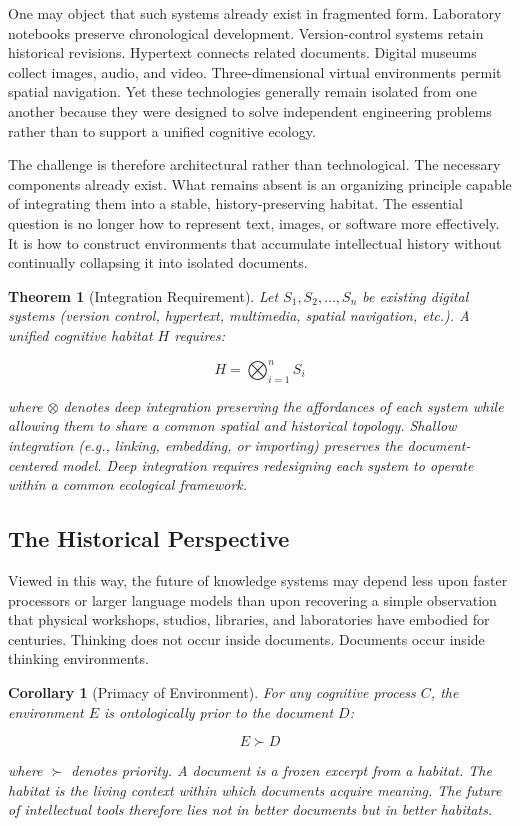 \documentclass[12pt,oneside]{article}
\newtheorem{theorem}[definition]{Theorem}
\newtheorem{corollary}[definition]{Corollary}
\theoremstyle{remark}
\begin{document}
One may object that such systems already exist in fragmented form. Laboratory notebooks preserve chronological development. Version-control systems retain historical revisions. Hypertext connects related documents. Digital museums collect images, audio, and video. Three-dimensional virtual environments permit spatial navigation. Yet these technologies generally remain isolated from one another because they were designed to solve independent engineering problems rather than to support a unified cognitive ecology.

The challenge is therefore architectural rather than technological. The necessary components already exist. What remains absent is an organizing principle capable of integrating them into a stable, history-preserving habitat. The essential question is no longer how to represent text, images, or software more effectively. It is how to construct environments that accumulate intellectual history without continually collapsing it into isolated documents.

\begin{theorem}[Integration Requirement]
Let $S_1, S_2, \ldots, S_n$ be existing digital systems (version control, hypertext, multimedia, spatial navigation, etc.). A unified cognitive habitat $H$ requires:

\begin{equation}
H = \bigotimes_{i=1}^{n} S_i
\end{equation}

where $\otimes$ denotes deep integration preserving the affordances of each system while allowing them to share a common spatial and historical topology. Shallow integration (e.g., linking, embedding, or importing) preserves the document-centered model. Deep integration requires redesigning each system to operate within a common ecological framework.
\end{theorem}

\subsection{The Historical Perspective}

Viewed in this way, the future of knowledge systems may depend less upon faster processors or larger language models than upon recovering a simple observation that physical workshops, studios, libraries, and laboratories have embodied for centuries. Thinking does not occur inside documents. Documents occur inside thinking environments.

\begin{corollary}[Primacy of Environment]
For any cognitive process $C$, the environment $E$ is ontologically prior to the document $D$:

\begin{equation}
E \succ D
\end{equation}

where $\succ$ denotes priority. A document is a frozen excerpt from a habitat. The habitat is the living context within which documents acquire meaning. The future of intellectual tools therefore lies not in better documents but in better habitats.
\end{corollary}
\end{document}
